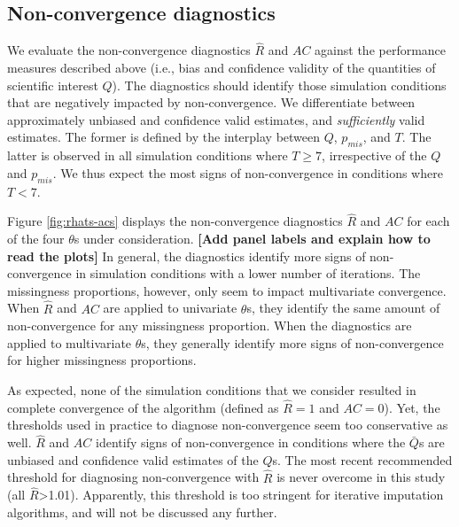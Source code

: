 \documentclass[Royal,times,sageh]{sagej}
\begin{document}
\hypertarget{non-convergence-diagnostics}{%
\subsection{Non-convergence diagnostics}\label{non-convergence-diagnostics}}

We evaluate the non-convergence diagnostics \(\widehat{R}\) and \(AC\) against the performance measures described above (i.e., bias and confidence validity of the quantities of scientific interest \(Q\)). The diagnostics should identify those simulation conditions that are negatively impacted by non-convergence. We differentiate between approximately unbiased and confidence valid estimates, and \emph{sufficiently} valid estimates. The former is defined by the interplay between \(Q\), \(p_{mis}\), and \(T\). The latter is observed in all simulation conditions where \(T\geq7\), irrespective of the \(Q\) and \(p_{mis}\). We thus expect the most signs of non-convergence in conditions where \(T<7\).

Figure \ref{fig:rhats-acs} displays the non-convergence diagnostics \(\widehat{R}\) and \(AC\) for each of the four \(\theta\)s under consideration. \textbf{{[}Add panel labels and explain how to read the plots{]}} In general, the diagnostics identify more signs of non-convergence in simulation conditions with a lower number of iterations. The missingness proportions, however, only seem to impact multivariate convergence. When \(\widehat{R}\) and \(AC\) are applied to univariate \(\theta\)s, they identify the same amount of non-convergence for any missingness proportion. When the diagnostics are applied to multivariate \(\theta\)s, they generally identify more signs of non-convergence for higher missingness proportions.

As expected, none of the simulation conditions that we consider resulted in complete convergence of the algorithm (defined as \(\widehat{R}=1\) and \(AC=0\)). Yet, the thresholds used in practice to diagnose non-convergence seem too conservative as well. \(\widehat{R}\) and \(AC\) identify signs of non-convergence in conditions where the \(\bar{Q}\)s are unbiased and confidence valid estimates of the \(Q\)s. The most recent recommended threshold for diagnosing non-convergence with \(\widehat{R}\) is never overcome in this study (all \(\widehat{R}\)\textgreater1.01). Apparently, this threshold is too stringent for iterative imputation algorithms, and will not be discussed any further.
\end{document}
